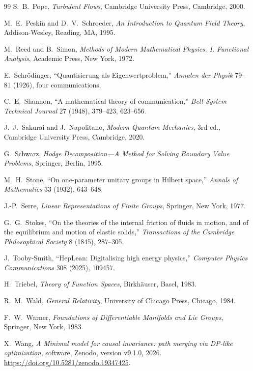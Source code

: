 \begin{thebibliography}{99}
S.~B.~Pope,
\emph{Turbulent Flows},
Cambridge University Press, Cambridge, 2000.

M.~E.~Peskin and D.~V.~Schroeder,
\emph{An Introduction to Quantum Field Theory},
Addison-Wesley, Reading, MA, 1995.

M.~Reed and B.~Simon,
\emph{Methods of Modern Mathematical Physics. I. Functional Analysis},
Academic Press, New York, 1972.

E.~Schr\"odinger,
``Quantisierung als Eigenwertproblem,''
\emph{Annalen der Physik} 79--81 (1926), four communications.

C.~E.~Shannon,
``A mathematical theory of communication,''
\emph{Bell System Technical Journal} 27 (1948), 379--423, 623--656.

J.~J.~Sakurai and J.~Napolitano,
\emph{Modern Quantum Mechanics},
3rd ed., Cambridge University Press, Cambridge, 2020.

G.~Schwarz,
\emph{Hodge Decomposition---A Method for Solving Boundary Value Problems},
Springer, Berlin, 1995.

M.~H.~Stone,
``On one-parameter unitary groups in Hilbert space,''
\emph{Annals of Mathematics} 33 (1932), 643--648.

J.-P.~Serre,
\emph{Linear Representations of Finite Groups},
Springer, New York, 1977.

G.~G.~Stokes,
``On the theories of the internal friction of fluids in motion, and of the equilibrium and motion of elastic solids,''
\emph{Transactions of the Cambridge Philosophical Society} 8 (1845), 287--305.

J.~Tooby-Smith,
``HepLean: Digitalising high energy physics,''
\emph{Computer Physics Communications} 308 (2025), 109457.

H.~Triebel,
\emph{Theory of Function Spaces},
Birkh\"auser, Basel, 1983.

R.~M.~Wald,
\emph{General Relativity},
University of Chicago Press, Chicago, 1984.

F.~W.~Warner,
\emph{Foundations of Differentiable Manifolds and Lie Groups},
Springer, New York, 1983.

X.~Wang,
\emph{A Minimal model for causal invariance: path merging via DP-like optimization},
software, Zenodo, version v9.1.0, 2026.
\url{https://doi.org/10.5281/zenodo.19347425}.


\end{thebibliography}

